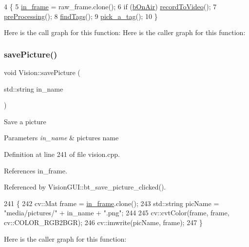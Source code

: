 \begin{DoxyCode}
4                                 \{
5     \hyperlink{class_vision_a905e6a0333e4931dfd2e0e44b07b51c9}{in\_frame} = raw\_frame.clone();
6     \textcolor{keywordflow}{if} (\hyperlink{class_vision_a1eb56f5e3433ca3dce53fe315b845979}{bOnAir}) \hyperlink{class_vision_a2ce5281f1eb08b71952407ef2a3f5eab}{recordToVideo}();
7     \hyperlink{class_vision_a6d23298e695a938d2491ae1f6264c694}{preProcessing}();
8     \hyperlink{class_vision_a7321350b5ea7648219a4cd4f0f7ca48e}{findTags}();
9     \hyperlink{class_vision_ada61d6f3bfc003a8e0e49bb5ee3516a3}{pick\_a\_tag}();
10 \}
\end{DoxyCode}
Here is the call graph for this function\+:
Here is the caller graph for this function\+:
\mbox{\label{class_vision_a324ad2f355fa414ee484e8ce9b247ffc}} 
\subsubsection{\texorpdfstring{save\+Picture()}{savePicture()}}
{\footnotesize\ttfamily void Vision\+::save\+Picture (\begin{DoxyParamCaption}\item[{std\+::string}]{in\+\_\+name }\end{DoxyParamCaption})}

Save a picture 
\begin{DoxyParams}{Parameters}
{\em in\+\_\+name} & picture\textquotesingle{}s name \\
\hline
\end{DoxyParams}


Definition at line 241 of file vision.\+cpp.



References in\+\_\+frame.



Referenced by Vision\+G\+U\+I\+::bt\+\_\+save\+\_\+picture\+\_\+clicked().


\begin{DoxyCode}
241                                           \{
242     cv::Mat frame = \hyperlink{class_vision_a905e6a0333e4931dfd2e0e44b07b51c9}{in\_frame}.clone();
243     std::string picName = \textcolor{stringliteral}{"media/pictures/"} + in\_name + \textcolor{stringliteral}{".png"};
244 
245     cv::cvtColor(frame, frame, cv::COLOR\_RGB2BGR);
246     cv::imwrite(picName, frame);
247 \}
\end{DoxyCode}
Here is the caller graph for this function\+:
\mbox{\label{class_vision_a717cabba99a7e8d5613df6dc699e31fe}} 
